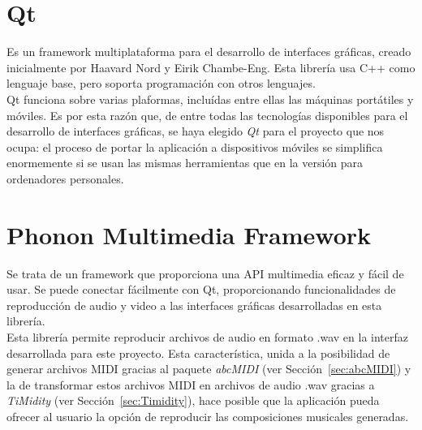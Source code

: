 \section{Qt}
\label{sec:Qt}

Es un framework multiplataforma para el desarrollo de interfaces gráficas, creado inicialmente por Haavard Nord y Eirik Chambe-Eng. Esta librería usa C++ como lenguaje base, pero soporta programación con otros lenguajes.\\

Qt funciona sobre varias plaformas, incluídas entre ellas las máquinas portátiles y móviles. Es por esta razón que, de entre todas las tecnologías disponibles para el desarrollo de interfaces gráficas, se haya elegido \emph{Qt} para el proyecto que nos ocupa: el proceso de portar la aplicación a dispositivos móviles se simplifica enormemente si se usan las mismas herramientas que en la versión para ordenadores personales.

\section{Phonon Multimedia Framework}
\label{sec:Phonon}

Se trata de un framework que proporciona una API multimedia eficaz y fácil de usar. Se puede conectar fácilmente con Qt, proporcionando funcionalidades de reproducción de audio y video a las interfaces gráficas desarrolladas en esta librería.\\

Esta librería permite reproducir archivos de audio en formato .wav en la interfaz desarrollada para este proyecto. Esta característica, unida a la posibilidad de generar archivos MIDI gracias al paquete \emph{abcMIDI} (ver Sección~\ref{sec:abcMIDI}) y la de transformar estos archivos MIDI en archivos de audio .wav gracias a \emph{TiMidity} (ver Sección~\ref{sec:Timidity}), hace posible que la aplicación pueda ofrecer al usuario la opción de reproducir las composiciones musicales generadas.